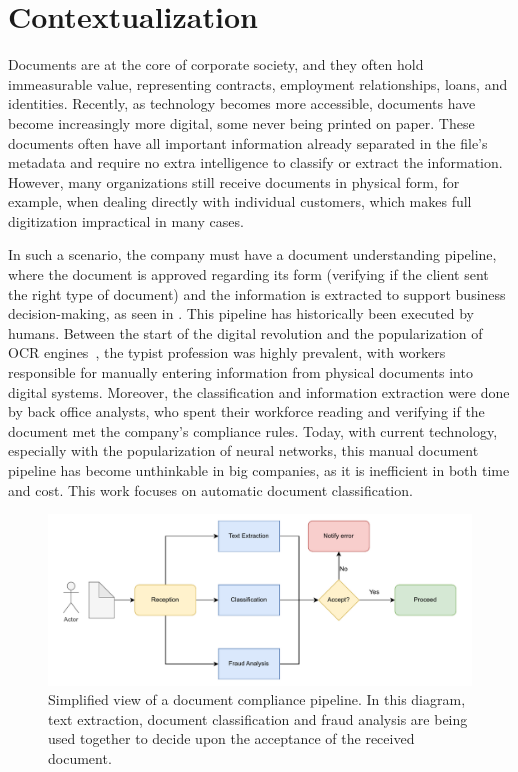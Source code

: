 \section{Contextualization}

Documents are at the core of corporate society, and they often hold immeasurable value, representing contracts, employment relationships, loans, and identities. Recently, as technology becomes more accessible, documents have become increasingly more digital, some never being printed on paper. These documents often have all important information already separated in the file's metadata and require no extra intelligence to classify or extract the information. However, many organizations still receive documents in physical form, for example, when dealing directly with individual customers, which makes full digitization impractical in many cases.

In such a scenario, the company must have a document understanding pipeline, where the document is approved regarding its form (verifying if the client sent the right type of document) and the information is extracted to support business decision-making, as seen in . This pipeline has historically been executed by humans. Between the start of the digital revolution and the popularization of \gls{OCR} engines~\cite{kay_tesseract_2007, mindee_doctr_2021}, the typist profession was highly prevalent, with workers responsible for manually entering information from physical documents into digital systems. Moreover, the classification and information extraction were done by back office analysts, who spent their workforce reading and verifying if the document met the company's compliance rules. Today, with current technology, especially with the popularization of neural networks, this manual document pipeline has become unthinkable in big companies, as it is inefficient in both time and cost. This work focuses on automatic document classification.

\begin{figure}[htbp]
\centering
\includegraphics[width=1\linewidth]{images/diagrama-compliance.drawio.pdf}
\caption{Simplified view of a document compliance pipeline. In this diagram, text extraction, document classification and fraud analysis are being used together to decide upon the acceptance of the received document.}
\label{fig:compliance}
\end{figure}

